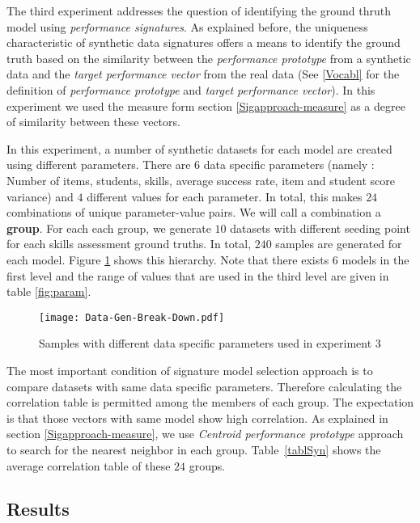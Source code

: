 The third experiment addresses the question of identifying the ground thruth model using \textit{performance signatures}. As explained before, the uniqueness characteristic of synthetic data signatures offers a means to identify the ground truth based on the similarity between the \textit{performance prototype} from a synthetic data and the \textit{target performance vector} from the real data (See \ref{Vocabl} for the definition of \textit{performance prototype} and \textit{target performance vector}). In this experiment we used the measure form section \ref{Sigapproach-measure} as a degree of similarity between these vectors.

In this experiment, a number of synthetic datasets for each model are created using different parameters. There are $6$ data specific parameters (namely : Number of items, students, skills, average success rate, item and student score variance) and $4$ different values for each parameter. In total, this makes $24$ combinations of unique parameter-value pairs. We will call a combination a \textbf{group}. For each each group, we generate $10$ datasets with different seeding point for each skills assessment ground truths. In total, $240$ samples are generated for each model. Figure \ref{figData-Gen-Break-Down} shows this hierarchy. Note that there exists 6 models in the first level and the range of values that are used in the third level are given in table \ref{fig:param}.

 \begin{figure}[h]
  \centering
    \texttt{[image: Data-Gen-Break-Down.pdf]}
\caption{Samples with different data specific parameters used in experiment 3}
\label{figData-Gen-Break-Down}
\end{figure}


The most important condition of signature model selection approach is to compare datasets with same data specific parameters. Therefore calculating the correlation table is permitted among the members of each group. The expectation is that those vectors with same model show high correlation. As explained in section \ref{Sigapproach-measure}, we use \textit{Centroid performance prototype} approach to search for the nearest neighbor in each group. Table~\ref{tablSyn} shows the average correlation table of these $24$ groups.

\subsection{Results}

